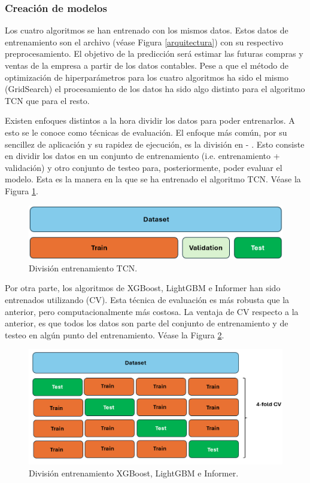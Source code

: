 \subsubsection{Creación de modelos}
Los cuatro algoritmos se han entrenado con los mismos datos. Estos datos de entrenamiento son el archivo  (véase Figura \ref{arquitectura}) con su respectivo preprocesamiento. El objetivo de la predicción será estimar las futuras compras y ventas de la empresa a partir de los datos contables. Pese a que el método de optimización de hiperparámetros para los cuatro algoritmos ha sido el mismo (GridSearch) el procesamiento de los datos ha sido algo distinto para el algoritmo TCN que para el resto. 

Existen enfoques distintos a la hora dividir los datos para poder entrenarlos. 
A esto se le conoce como técnicas de evaluación. El enfoque más común, por su sencillez de aplicación y su rapidez de ejecución, es la división en - . Esto consiste en dividir los datos en un conjunto de entrenamiento (i.e. entrenamiento + validación) y otro conjunto de testeo para, posteriormente, poder evaluar el modelo. Esta es la manera en la que se ha entrenado el algoritmo TCN. Véase la Figura \ref{trainTestSplit}.

\begin{figure}[H]
    \centering
    \includegraphics[scale = 0.4]{imgs/trainTestSplit.png}
    \caption{División entrenamiento TCN.}
    \label{trainTestSplit}
\end{figure}

Por otra parte, los algoritmos de XGBoost, LightGBM e Informer han sido entrenados utilizando  (CV). Esta técnica de evaluación es más robusta que la anterior, pero computacionalmente más costosa. La ventaja de CV respecto a la anterior, es que todos los datos son parte del conjunto de entrenamiento y de testeo en algún punto del entrenamiento. Véase la Figura \ref{CV}.

\begin{figure}[H]
    \centering
    \includegraphics[scale = 0.4]{imgs/cv.png}
    \caption{División entrenamiento XGBoost, LightGBM e Informer.}
    \label{CV}
\end{figure}


